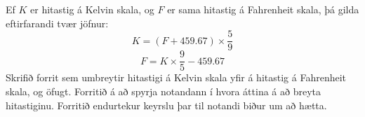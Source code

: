 \begin{problem}
	Ef $K$ er hitastig á Kelvin skala, og $F$ er sama hitastig á Fahrenheit skala, þá gilda eftirfarandi tvær jöfnur:
	\[ K = (F + 459.67) \times \frac{5}{9} \]
	\[ F = K \times \frac{9}{5} - 459.67 \]
	Skrifið forrit sem umbreytir hitastigi á Kelvin skala yfir á hitastig á Fahrenheit skala, og öfugt. Forritið á að spyrja notandann í hvora áttina á að breyta hitastiginu. Forritið endurtekur keyrslu þar til notandi biður um að hætta.

\begin{example}
%
\end{example}
\end{problem}